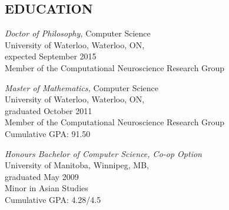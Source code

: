 \documentclass[line,margin]{res}
\begin{document}
\address{31 Mulberry Ln, Waterloo, ON}
\address{tbekolay@gmail.com $\cdot$ (519) 573-4815}

\begin{resume}

\section{EDUCATION}
  {\sl Doctor of Philosophy,} Computer Science \\
  University of Waterloo, Waterloo, ON, \\
  expected September 2015 \\
  Member of the Computational Neuroscience Research Group

  {\sl Master of Mathematics,} Computer Science \\
  University of Waterloo, Waterloo, ON, \\
  graduated October 2011 \\
  Member of the Computational Neuroscience Research Group \\
  Cumulative GPA: 91.50
  
  {\sl Honours Bachelor of Computer Science, Co-op Option} \\
  University of Manitoba, Winnipeg, MB, \\
  graduated May 2009 \\
  Minor in Asian Studies \\
  Cumulative GPA: 4.28/4.5


\end{resume}
\end{document}
